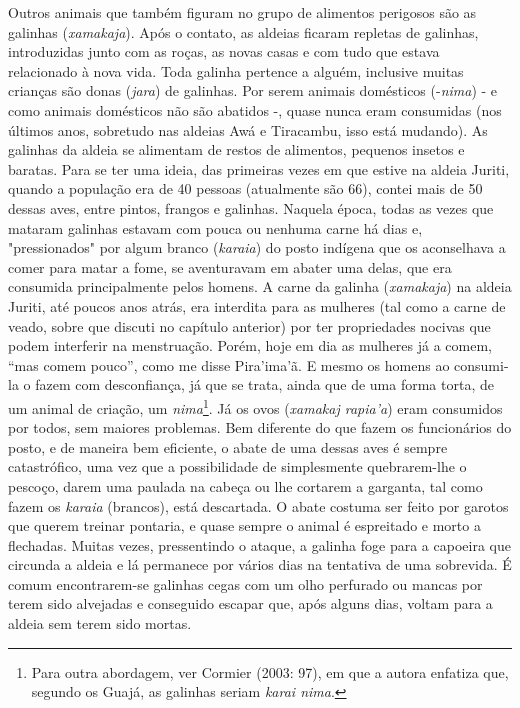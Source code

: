 Outros animais que também figuram no grupo de alimentos perigosos são as
galinhas (\emph{xamakaja}). Após o contato, as aldeias ficaram repletas
de galinhas, introduzidas junto com as roças, as novas casas e com tudo
que estava relacionado à nova vida. Toda galinha pertence a alguém,
inclusive muitas crianças são donas (\emph{jara}) de galinhas. Por serem
animais domésticos (-\emph{nima}) - e como animais domésticos não são
abatidos -, quase nunca eram consumidas (nos últimos anos, sobretudo nas
aldeias Awá e Tiracambu, isso está mudando). As galinhas da aldeia se
alimentam de restos de alimentos, pequenos insetos e baratas. Para se
ter uma ideia, das primeiras vezes em que estive na aldeia Juriti,
quando a população era de 40 pessoas (atualmente são 66), contei mais de
50 dessas aves, entre pintos, frangos e galinhas. Naquela época, todas
as vezes que mataram galinhas estavam com pouca ou nenhuma carne há dias
e, "pressionados" por algum branco (\emph{karaia}) do posto indígena que
os aconselhava a comer para matar a fome, se aventuravam em abater uma
delas, que era consumida principalmente pelos homens. A carne da galinha
(\emph{xamakaja}) na aldeia Juriti, até poucos anos atrás, era interdita
para as mulheres (tal como a carne de veado, sobre que discuti no
capítulo anterior) por ter propriedades nocivas que podem interferir na
menstruação. Porém, hoje em dia as mulheres já a comem, ``mas comem
pouco'', como me disse Pira'ima'ã. E mesmo os homens ao consumi-la o
fazem com desconfiança, já que se trata, ainda que de uma forma torta,
de um animal de criação, um \emph{nima}\footnote{Para outra abordagem,
  ver Cormier (2003: 97), em que a autora enfatiza que, segundo os
  Guajá, as galinhas seriam \emph{karai nima}.}. Já os ovos
(\emph{xamakaj rapia'a}) eram consumidos por todos, sem maiores
problemas. Bem diferente do que fazem os funcionários do posto, e de
maneira bem eficiente, o abate de uma dessas aves é sempre catastrófico,
uma vez que a possibilidade de simplesmente quebrarem-lhe o pescoço,
darem uma paulada na cabeça ou lhe cortarem a garganta, tal como fazem
os \emph{karaia} (brancos), está descartada. O abate costuma ser feito
por garotos que querem treinar pontaria, e quase sempre o animal é
espreitado e morto a flechadas. Muitas vezes, pressentindo o ataque, a
galinha foge para a capoeira que circunda a aldeia e lá permanece por
vários dias na tentativa de uma sobrevida. É comum encontrarem-se
galinhas cegas com um olho perfurado ou mancas por terem sido alvejadas
e conseguido escapar que, após alguns dias, voltam para a aldeia sem
terem sido mortas.

